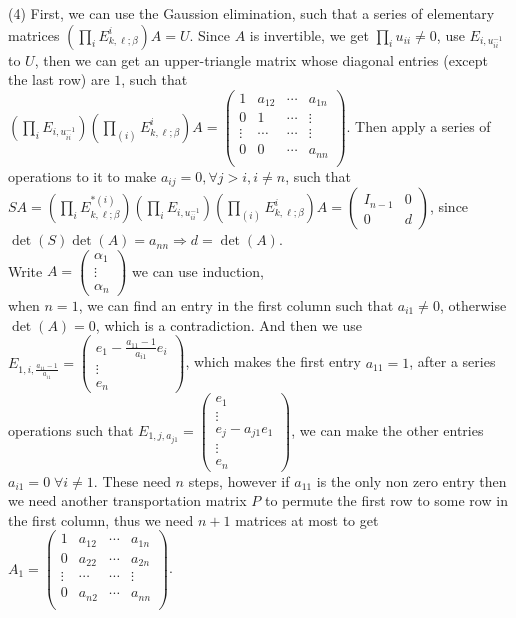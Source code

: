 \documentclass[12pt]{article}
\begin{document}
\medskip
(4)
First, we can use the Gaussion elimination, such that a series of elementary matrices $(\prod_{i} E_{k,\ell; \beta}^{i}) A = U$. Since $A$ is invertible, we get $\prod_i u_{ii} \neq 0$, use $E_{i, u_{ii}^{-1}}$ to $U$, then we can get an upper-triangle matrix whose diagonal entries (except the last row) are $1$, such that $(\prod_i E_{i, u_{ii}^{-1}})(\prod_{(i)} E_{k,\ell; \beta}^{i}) A = \begin{pmatrix}
1 & a_{12} & \cdots & a_{1n} \\
0 & 1 &\cdots & \vdots \\
\vdots & \cdots & \cdots & \vdots \\ 
0 & 0 & \cdots & a_{nn} \\ 
\end{pmatrix}$. Then apply a series of operations to it to make $a_{ij} = 0, \forall j > i, i \neq n$, such that $SA = (\prod_{i} E_{k,\ell; \beta}^{*(i)})(\prod_i E_{i, u_{ii}^{-1}})(\prod_{(i)} E_{k,\ell; \beta}^{i}) A  = \begin{pmatrix}
I_{n - 1} & 0 \\
0 & d
\end{pmatrix}$, since $\det(S) \det(A) = a_{nn} \Rightarrow d = \det(A)$.\\
Write $A = \begin{pmatrix}
\alpha_1 \\
\vdots \\
\alpha_n
\end{pmatrix}$ we can use induction, \\
when $n = 1$, we can find an entry in the first column such that $a_{i1} \neq 0$, otherwise $\det(A) = 0$, which is a contradiction. And then we use $E_{1,i, \frac{a_{11} - 1}{a_{i1}}} = 
\begin{pmatrix}
e_1 - \frac{a_{11} - 1}{a_{i1}}e_i\\
\vdots \\
e_n 
\end{pmatrix}$, which makes the first entry $a_{11} = 1$, after a series operations such that $E_{1, j, a_{j1}} = \begin{pmatrix}
e_1 \\
\vdots \\
e_j - a_{j1}e_1 \\
\vdots \\
e_n 
\end{pmatrix}$, we can make the other entries $a_{i1} = 0\; \forall i \neq 1 $. These need $n$ steps, however if $a_{11}$ is the only non zero entry then we need another transportation matrix $P$ to permute the first row to some row in the first column, thus we need $n + 1$ matrices at most to get $A_1 = \begin{pmatrix}
1 & a_{12} & \cdots & a_{1n}\\
0 & a_{22} & \cdots & a_{2n}\\
\vdots & \cdots & \cdots & \vdots \\
0 & a_{n2} & \cdots & a_{nn}\\
\end{pmatrix}$. \\
\end{document}
